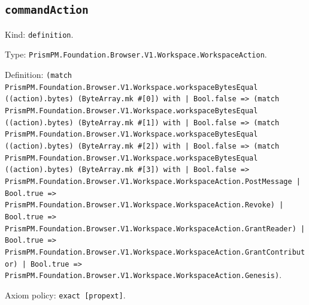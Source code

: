 \documentclass[11pt]{article}
\begin{document}
\subsection*{\texttt{commandAction}}
\noindent Kind: \texttt{definition}.\par
\noindent Type: \texttt{PrismPM.Foundation.Browser.V1.Workspace.WorkspaceAction}.\par
\noindent Definition: \texttt{(match PrismPM.Foundation.Browser.V1.Workspace.workspaceBytesEqual ((action).bytes) (ByteArray.mk \#[0]) with | Bool.false => (match PrismPM.Foundation.Browser.V1.Workspace.workspaceBytesEqual ((action).bytes) (ByteArray.mk \#[1]) with | Bool.false => (match PrismPM.Foundation.Browser.V1.Workspace.workspaceBytesEqual ((action).bytes) (ByteArray.mk \#[2]) with | Bool.false => (match PrismPM.Foundation.Browser.V1.Workspace.workspaceBytesEqual ((action).bytes) (ByteArray.mk \#[3]) with | Bool.false => PrismPM.Foundation.Browser.V1.Workspace.WorkspaceAction.PostMessage | Bool.true => PrismPM.Foundation.Browser.V1.Workspace.WorkspaceAction.Revoke) | Bool.true => PrismPM.Foundation.Browser.V1.Workspace.WorkspaceAction.GrantReader) | Bool.true => PrismPM.Foundation.Browser.V1.Workspace.WorkspaceAction.GrantContributor) | Bool.true => PrismPM.Foundation.Browser.V1.Workspace.WorkspaceAction.Genesis)}.\par
\noindent Axiom policy: \texttt{exact [propext]}.\par
\end{document}

